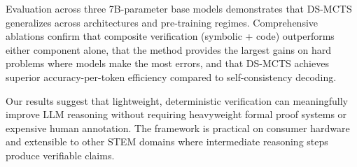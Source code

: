 \documentclass[11pt,a4paper]{article}
\begin{document}
Evaluation across three 7B-parameter base models demonstrates that DS-MCTS
generalizes across architectures and pre-training regimes. Comprehensive
ablations confirm that composite verification (symbolic + code) outperforms
either component alone, that the method provides the largest gains on hard
problems where models make the most errors, and that DS-MCTS achieves superior
accuracy-per-token efficiency compared to self-consistency decoding.

Our results suggest that lightweight, deterministic verification can
meaningfully improve LLM reasoning without requiring heavyweight formal proof
systems or expensive human annotation. The framework is practical on consumer
hardware and extensible to other STEM domains where intermediate reasoning
steps produce verifiable claims.



% 
\end{document}
